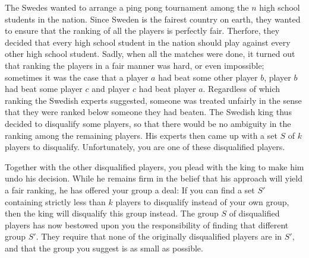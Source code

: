 
\noindent
The Swedes wanted to arrange a ping pong tournament among the $n$ high school students in the nation. Since Sweden is the fairest country on earth, they wanted to ensure that the ranking of all the players is perfectly fair. Therfore, they decided that every high school student in the nation should play against every other high school student. Sadly, when all the matches were done, it turned out that ranking the players in a fair manner was hard, or even impossible; sometimes it was the case that a player $a$ had beat some other player $b$, player $b$ had beat some player $c$ and player $c$ had beat player $a$. Regardless of which ranking the Swedish experts suggested, someone was treated unfairly in the sense that they were ranked below someone they had beaten. The Swedish king thus decided to disqualify some players, so that there would be no ambiguity in the ranking among the remaining players. His experts then came up with a set $S$ of $k$ players to disqualify. Unfortunately, you are one of these disqualified players. 

Together with the other disqualified players, you plead with the king to make him undo his decision. While he remains firm in the belief that his approach will yield a fair ranking, he has offered your group a deal: If you can find a set $S'$ containing strictly less than $k$ players to disqualify instead of your own group, then the king will disqualify this group instead. The group $S$ of disqualified players has now bestowed upon you the responsibility of finding that different group $S'$. They require that none of the originally disqualified players are in $S'$, and that the group you suggest is as small as possible.

